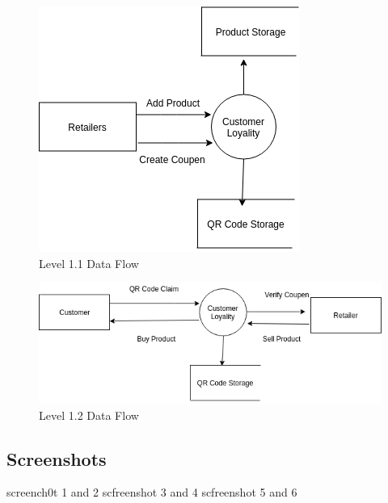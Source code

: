 \hspace{2.0mm}
\begin{figure}[H]
\includegraphics[scale=0.63]{level1_1}
\caption{Level 1.1 Data Flow}
\end{figure}
\vspace{2cm}
\begin{figure}[H]
\includegraphics[scale=0.63]{level1_2}
\caption{Level 1.2 Data Flow}
\end{figure}
\newpage

\subsection{Screenshots}
screench0t 1 and 2
\newpage
scfreenshot 3 and 4
\newpage
scfreenshot 5 and 6




